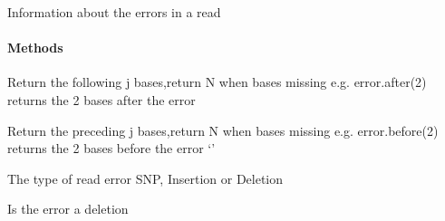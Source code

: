 \documentclass[letterpaper,10pt,english]{sphinxmanual}
\begin{document}

\begin{fulllineitems}
\label{index:proto_err.errorCount.error}
Information about the errors in a read
\paragraph{Methods}

\begin{fulllineitems}
\label{index:proto_err.errorCount.error.after}
Return the following j bases,return N when bases missing
e.g. error.after(2) returns the 2 bases after the error

\end{fulllineitems}


\begin{fulllineitems}
\label{index:proto_err.errorCount.error.before}
Return the preceding j bases,return N when bases missing
e.g. error.before(2) returns the 2 bases before the error
`'

\end{fulllineitems}


\begin{fulllineitems}
\label{index:proto_err.errorCount.error.errorType}
The type of read error 
SNP, Insertion or Deletion

\end{fulllineitems}


\begin{fulllineitems}
\label{index:proto_err.errorCount.error.isDeletion}
Is the error a deletion

\end{fulllineitems}



\end{fulllineitems}
\end{document}

